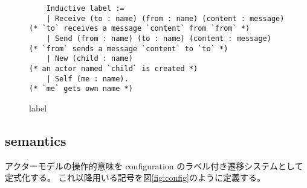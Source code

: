 \begin{figure}[tb]
  \begin{lstlisting}
    Inductive label :=
    | Receive (to : name) (from : name) (content : message) (* `to` receives a message `content` from `from` *)
    | Send (from : name) (to : name) (content : message)    (* `from` sends a message `content` to `to` *)
    | New (child : name)                                    (* an actor named `child` is created *)
    | Self (me : name).                                     (* `me` gets own name *)
  \end{lstlisting}
  \caption{label}\label{coq:label}
\end{figure}


\subsection{semantics}

アクターモデルの操作的意味を configuration のラベル付き遷移システムとして定式化する。
これ以降用いる記号を図\ref{fig:config}のように定義する。

